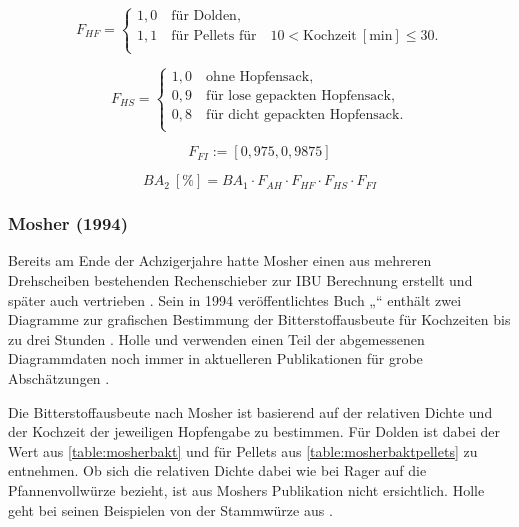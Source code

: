 \documentclass[a4paper,parskip=half]{scrartcl}
\newcommand{\BA}{\mathit{BA}}
\newcommand{\umin}{\:[\textrm{min}]}
\newcommand{\uper}{\:[\text{\%}]}
\newcommand{\FAH}{F_{\mathit{AH}}}
\newcommand{\FHF}{F_{\mathit{HF}}}
\newcommand{\FHS}{F_{\mathit{HS}}}
\newcommand{\FFil}{F_{\mathit{FI}}}
\begin{document}
\begin{equation}
\FHF = \begin{cases}
1,0 \quad \text{für Dolden}, \\
1,1 \quad \text{für Pellets für} \quad 10 < \text{Kochzeit} \umin \le 30. \\
\end{cases}
\label{eq:garetzhf}
\end{equation}

\begin{equation}
\FHS = \begin{cases}
1,0 \quad \text{ohne Hopfensack}, \\
0,9 \quad \text{für lose gepackten Hopfensack}, \\
0,8 \quad \text{für dicht gepackten Hopfensack}. \\
\end{cases}
\label{eq:garetzhs}
\end{equation}

\begin{equation}
\FFil := \left[0,975, 0,9875 \right]
\label{eq:garetzfil}
\end{equation}

\begin{equation}
\BA_2 \uper = BA_1 \cdot \FAH \cdot \FHF \cdot \FHS \cdot \FFil
\label{eq:garetzba2}
\end{equation}

\subsubsection*{Mosher (1994)}

Bereits am Ende der Achzigerjahre hatte Mosher einen aus mehreren
Drehscheiben bestehenden Rechenschieber zur IBU Berechnung erstellt und später
auch vertrieben \parencite{Mosher2022}. Sein in 1994 veröffentlichtes
Buch „“ enthält zwei Diagramme zur grafischen
Bestimmung der Bitterstoffausbeute für Kochzeiten bis zu drei Stunden
\parencite[160\psq]{Mosher1994}. Holle und \citeauthor{Thesseling2019} verwenden
einen Teil der abgemessenen Diagrammdaten noch immer in aktuelleren
Publikationen für grobe Abschätzungen \parencites[51]{Holle2010}{Thesseling2019}.

Die Bitterstoffausbeute nach Mosher ist basierend auf der relativen Dichte und
der Kochzeit der jeweiligen Hopfengabe zu bestimmen. Für Dolden ist
dabei der Wert aus \autoref{table:mosherbakt} und für Pellets aus
\autoref{table:mosherbaktpellets} zu entnehmen. Ob sich die
relativen Dichte dabei wie bei Rager auf die Pfannenvollwürze bezieht, ist aus Moshers Publikation nicht ersichtlich. Holle geht bei seinen Beispielen
von der Stammwürze aus \parencite[53]{Holle2010}.
\end{document}
